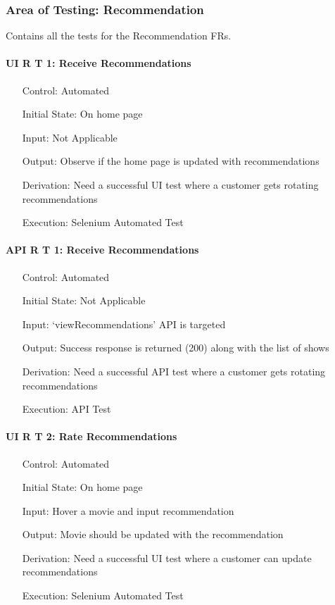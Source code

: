 \documentclass[12pt, titlepage]{article}
\begin{document}
\subsubsection{Area of Testing: Recommendation}
Contains all the tests for the Recommendation FRs.

\paragraph*{UI R T 1: Receive Recommendations}
\begin{itemize}
	\item[Control:] Automated
	\item[Initial State:] On home page
	\item[Input:] Not Applicable
	\item[Output:] Observe if the home page is updated with recommendations
	\item[Derivation:] Need a successful UI test where a customer gets rotating recommendations
	\item[Execution:] Selenium Automated Test
\end{itemize}

\paragraph*{API R T 1: Receive Recommendations}
\begin{itemize}
	\item[Control:] Automated
	\item[Initial State:] Not Applicable
	\item[Input:] `viewRecommendations' API is targeted
	\item[Output:] Success response is returned (200) along with the list of shows
	\item[Derivation:] Need a successful API test where a customer gets rotating recommendations
	\item[Execution:] API Test
\end{itemize}

\paragraph*{UI R T 2: Rate Recommendations}
\begin{itemize}
	\item[Control:] Automated
	\item[Initial State:] On home page
	\item[Input:] Hover a movie and input recommendation
	\item[Output:] Movie should be updated with the recommendation
	\item[Derivation:] Need a successful UI test where a customer can update recommendations
	\item[Execution:] Selenium Automated Test
\end{itemize}
\end{document}
